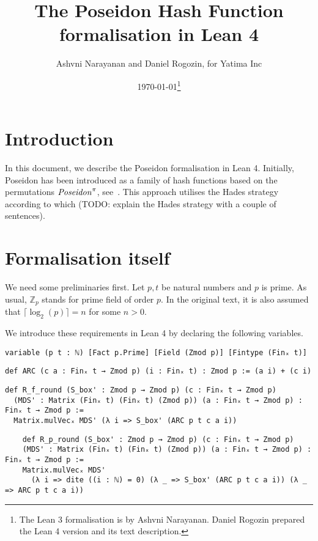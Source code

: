 \documentclass{article}
\title{The Poseidon Hash Function formalisation in Lean 4}
\author{Ashvni Narayanan and Daniel Rogozin, for Yatima Inc}
\date{\today\footnote{The Lean 3 formalisation is by Ashvni Narayanan. Daniel Rogozin prepared the Lean 4 version and its text description.}}
\theoremstyle{definition}
\theoremstyle{remark}
\begin{document}
\maketitle

\section{Introduction}

In this document, we describe the Poseidon formalisation in Lean 4.
Initially, Poseidon has been introduced as a family of hash functions based on the permutations $\text{\emph{Poseidon}}^{\pi}$, see~\cite{grassi2021poseidon}.
This approach utilises the Hades strategy~\cite{grassi2020generalization} according to which (TODO: explain the Hades strategy with a couple of sentences).

\section{Formalisation itself}

We need some preliminaries first. Let $p, t$ be natural numbers and $p$ is prime. 
As usual, $\mathbb{Z}_p$ stands for prime field of order $p$. 
In the original text, it is also assumed that $\lceil \log_2(p) \rceil = n$ for some $n > 0$.

We introduce these requirements in Lean 4 by declaring the following variables.

\begin{lstlisting}
variable (p t : ℕ) [Fact p.Prime] [Field (Zmod p)] [Fintype (Finₓ t)]
\end{lstlisting}

\begin{lstlisting}
def ARC (c a : Finₓ t → Zmod p) (i : Finₓ t) : Zmod p := (a i) + (c i)
\end{lstlisting}

\begin{lstlisting}
def R_f_round (S_box' : Zmod p → Zmod p) (c : Finₓ t → Zmod p)
  (MDS' : Matrix (Finₓ t) (Finₓ t) (Zmod p)) (a : Finₓ t → Zmod p) : Finₓ t → Zmod p :=
  Matrix.mulVecₓ MDS' (λ i => S_box' (ARC p t c a i))
\end{lstlisting}

\begin{lstlisting}
    def R_p_round (S_box' : Zmod p → Zmod p) (c : Finₓ t → Zmod p)
    (MDS' : Matrix (Finₓ t) (Finₓ t) (Zmod p)) (a : Finₓ t → Zmod p) : Finₓ t → Zmod p :=
    Matrix.mulVecₓ MDS' 
      (λ i => dite ((i : ℕ) = 0) (λ _ => S_box' (ARC p t c a i)) (λ _ => ARC p t c a i))
\end{lstlisting}
\end{document}
